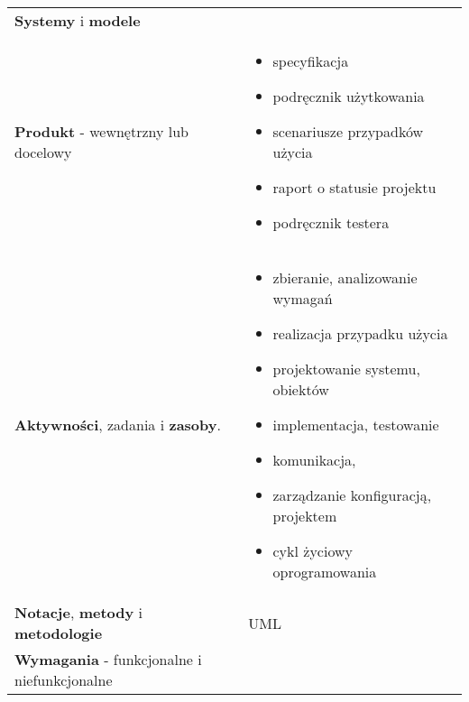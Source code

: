 \documentclass[a4paper]{article}
\begin{document}
\begin{table}[H]
\begin{center}
\begin{tabular}{  p{8cm} p{8cm}  }
                \textbf{Systemy} i \textbf{modele} & \\
                \cmidrule(r){1-1}\cmidrule(l){2-2}
                \textbf{Produkt} - wewnętrzny lub docelowy
                &
                \begin{itemize}
                    \item specyfikacja
                    \item podręcznik użytkowania
                    \item scenariusze przypadków użycia
                    \item raport o statusie projektu
                    \item podręcznik testera
                \end{itemize}
                \\
                \cmidrule(r){1-1}\cmidrule(l){2-2}
                \textbf{Aktywności}, zadania i \textbf{zasoby}.
                &
                \begin{itemize}
                    \item zbieranie, analizowanie wymagań
                    \item realizacja przypadku użycia
                    \item projektowanie systemu, obiektów
                    \item implementacja, testowanie
                    \item komunikacja,
                    \item zarządzanie konfiguracją, projektem
                    \item cykl życiowy oprogramowania
                \end{itemize}
                \\
                \cmidrule(r){1-1}\cmidrule(l){2-2}
                \textbf{Notacje}, \textbf{metody} i \textbf{metodologie}
                &
                UML
                \\

                \textbf{Wymagania} - funkcjonalne i niefunkcjonalne & \\

            \end{tabular}
        \end{center}
    \end{table}
\end{document}
